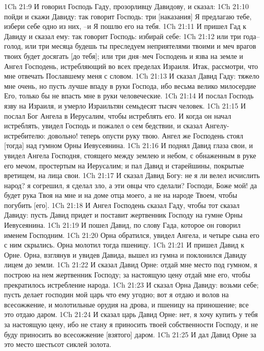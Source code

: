 1Ch 21:9  И говорил Господь Гаду, прозорливцу Давидову, и сказал:
1Ch 21:10  пойди и скажи Давиду: так говорит Господь: три [наказания] Я предлагаю тебе, избери себе одно из них, --и Я пошлю его на тебя.
1Ch 21:11  И пришел Гад к Давиду и сказал ему: так говорит Господь: избирай себе:
1Ch 21:12  или три года--голод, или три месяца будешь ты преследуем неприятелями твоими и меч врагов твоих будет досягать [до тебя]; или три дня--меч Господень и язва на земле и Ангел Господень, истребляющий во всех пределах Израиля. Итак, рассмотри, что мне отвечать Пославшему меня с словом.
1Ch 21:13  И сказал Давид Гаду: тяжело мне очень, но пусть лучше впаду в руки Господа, ибо весьма велико милосердие Его, только бы не впасть мне в руки человеческие.
1Ch 21:14  И послал Господь язву на Израиля, и умерло Израильтян семьдесят тысяч человек.
1Ch 21:15  И послал Бог Ангела в Иерусалим, чтобы истреблять его. И когда он начал истреблять, увидел Господь и пожалел о сем бедствии, и сказал Ангелу-истребителю: довольно! теперь опусти руку твою. Ангел же Господень стоял [тогда] над гумном Орны Иевусеянина.
1Ch 21:16  И поднял Давид глаза свои, и увидел Ангела Господня, стоящего между землею и небом, с обнаженным в руке его мечом, простертым на Иерусалим; и пал Давид и старейшины, покрытые вретищем, на лица свои.
1Ch 21:17  И сказал Давид Богу: не я ли велел исчислить народ? я согрешил, я сделал зло, а эти овцы что сделали? Господи, Боже мой! да будет рука Твоя на мне и на доме отца моего, а не на народе Твоем, чтобы погубить [его].
1Ch 21:18  И Ангел Господень сказал Гаду, чтобы тот сказал Давиду: пусть Давид придет и поставит жертвенник Господу на гумне Орны Иевусеянина.
1Ch 21:19  И пошел Давид, по слову Гада, которое он говорил именем Господним.
1Ch 21:20  Орна обратился, увидел Ангела, и четыре сына его с ним скрылись. Орна молотил тогда пшеницу.
1Ch 21:21  И пришел Давид к Орне. Орна, взглянув и увидев Давида, вышел из гумна и поклонился Давиду лицем до земли.
1Ch 21:22  И сказал Давид Орне: отдай мне место под гумном, я построю на нем жертвенник Господу; за настоящую цену отдай мне его, чтобы прекратилось истребление народа.
1Ch 21:23  И сказал Орна Давиду: возьми себе; пусть делает господин мой царь что ему угодно; вот я отдаю и волов на всесожжение, и молотильные орудия на дрова, и пшеницу на приношение; все это отдаю даром.
1Ch 21:24  И сказал царь Давид Орне: нет, я хочу купить у тебя за настоящую цену, ибо не стану я приносить твоей собственности Господу, и не буду приносить во всесожжение [взятого] даром.
1Ch 21:25  И дал Давид Орне за это место шестьсот сиклей золота.
